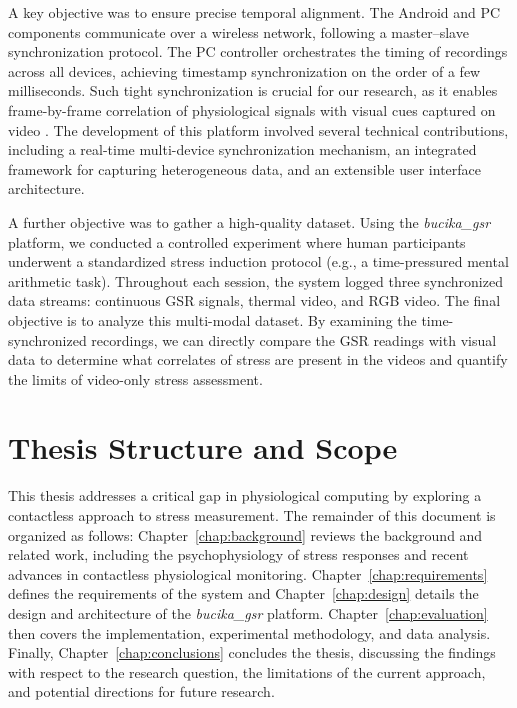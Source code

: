A key objective was to ensure precise temporal alignment. The Android and PC components communicate over a wireless network, following a master--slave synchronization protocol. The PC controller orchestrates the timing of recordings across all devices, achieving timestamp synchronization on the order of a few milliseconds. Such tight synchronization is crucial for our research, as it enables frame-by-frame correlation of physiological signals with visual cues captured on video \cite{Gravina2017}. The development of this platform involved several technical contributions, including a real-time multi-device synchronization mechanism, an integrated framework for capturing heterogeneous data, and an extensible user interface architecture.

A further objective was to gather a high-quality dataset. Using the \textit{bucika\_gsr} platform, we conducted a controlled experiment where human participants underwent a standardized stress induction protocol (e.g., a time-pressured mental arithmetic task). Throughout each session, the system logged three synchronized data streams: continuous GSR signals, thermal video, and RGB video. The final objective is to analyze this multi-modal dataset. By examining the time-synchronized recordings, we can directly compare the GSR readings with visual data to determine what correlates of stress are present in the videos and quantify the limits of video-only stress assessment.

\section{Thesis Structure and Scope}

This thesis addresses a critical gap in physiological computing by exploring a contactless approach to stress measurement. The remainder of this document is organized as follows: Chapter~\ref{chap:background} reviews the background and related work, including the psychophysiology of stress responses and recent advances in contactless physiological monitoring. Chapter~\ref{chap:requirements} defines the requirements of the system and Chapter~\ref{chap:design} details the design and architecture of the \textit{bucika\_gsr} platform. Chapter~\ref{chap:evaluation} then covers the implementation, experimental methodology, and data analysis. Finally, Chapter~\ref{chap:conclusions} concludes the thesis, discussing the findings with respect to the research question, the limitations of the current approach, and potential directions for future research.
